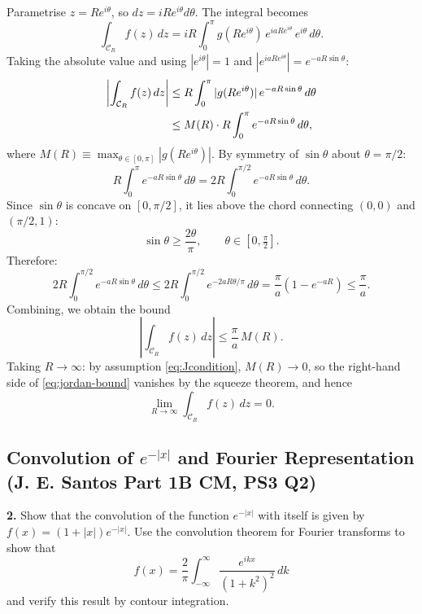 Parametrise $z = Re^{i\theta}$, so $dz = iRe^{i\theta}d\theta$. The
integral becomes
\begin{equation}
    \int_{\mathcal{C}_R}f(z)\,dz
    = iR\int^\pi_0 g(Re^{i\theta})\,e^{iaRe^{i\theta}}\,e^{i\theta}\,d\theta.
\end{equation}
Taking the absolute value and using $|e^{i\theta}|=1$ and
$|e^{iaRe^{i\theta}}| = e^{-aR\sin\theta}$:
\begin{align}
    \left|\int_{\mathcal{C}_R}f(z)\,dz\right|
    &\leq R\int^\pi_0 |g(Re^{i\theta})|\,e^{-aR\sin\theta}\,d\theta \notag\\
    &\leq M(R)\cdot R\int^\pi_0 e^{-aR\sin\theta}\,d\theta,
\end{align}
where $M(R)\equiv\max_{\theta\in[0,\pi]}|g(Re^{i\theta})|$. By symmetry of
$\sin\theta$ about $\theta=\pi/2$:
\begin{equation}
    R\int^\pi_0 e^{-aR\sin\theta}\,d\theta
    = 2R\int^{\pi/2}_0 e^{-aR\sin\theta}\,d\theta.
\end{equation}
Since $\sin\theta$ is concave on $[0,\pi/2]$, it lies above the chord
connecting $(0,0)$ and $(\pi/2,1)$:
\begin{equation}
    \sin\theta \geq \frac{2\theta}{\pi}, \qquad \theta\in\left[0,\tfrac{\pi}{2}\right].
\end{equation}
Therefore:
\begin{equation}
    2R\int^{\pi/2}_0 e^{-aR\sin\theta}\,d\theta
    \leq 2R\int^{\pi/2}_0 e^{-2aR\theta/\pi}\,d\theta
    = \frac{\pi}{a}\!\left(1-e^{-aR}\right)
    \leq \frac{\pi}{a}.
\end{equation}
Combining, we obtain the bound
\begin{equation}
    \left|\int_{\mathcal{C}_R}f(z)\,dz\right| \leq \frac{\pi}{a}\,M(R).
    \label{eq:jordan-bound}
\end{equation}
Taking $R\to\infty$: by assumption \eqref{eq:Jcondition}, $M(R)\to 0$, so
the right-hand side of \eqref{eq:jordan-bound} vanishes by the squeeze
theorem, and hence
\begin{equation}
    \lim_{R\to\infty}\int_{\mathcal{C}_R}f(z)\,d z = 0. 
\end{equation}

\subsection{Convolution of $e^{-|x|}$ and Fourier Representation (J. E. Santos Part 1B CM, PS3 Q2)}
\label{sec:convolution}

\textbf{2.} Show that the convolution of the function $e^{-|x|}$ with itself
is given by $f(x) = (1+|x|)e^{-|x|}$. Use the convolution theorem for Fourier
transforms to show that
\begin{equation}
  f(x) = \frac{2}{\pi}\int_{-\infty}^{\infty}\frac{e^{ikx}}{(1+k^2)^2}\,d k
\end{equation}
and verify this result by contour integration.

